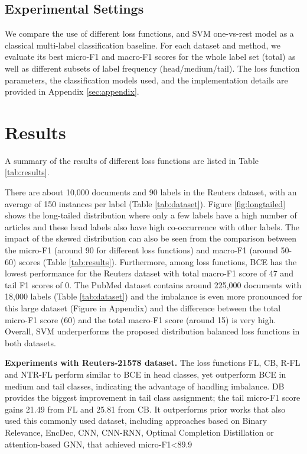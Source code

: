 \documentclass[11pt]{article}
\begin{document}
\subsection{Experimental Settings}
We compare the use of 
different loss functions, and SVM one-vs-rest model as a classical multi-label classification baseline. 
For each dataset and method, we evaluate its best micro-F1 and macro-F1 scores   \citep{wu-etal-2019-learning-learn, Lipton-F1} for the whole label set (total) as well as different 
subsets of label frequency (head/medium/tail). The loss function parameters, the classification models used, and the implementation details are provided in Appendix \ref{sec:appendix}. 





\section{Results}
A summary of the results of different loss functions are listed in Table \ref{tab:results}.

There are about 10,000 documents and 90 labels in the Reuters dataset, with an average of 150 instances per label (Table \ref{tab:dataset}). Figure \ref{fig:longtailed} shows the long-tailed distribution where only a few labels have a high number of articles and these head labels also have high co-occurrence with other labels.  The impact of the skewed distribution can also be seen from the comparison between the micro-F1 (around 90 for different loss functions) and macro-F1 (around 50-60) scores (Table \ref{tab:results}). Furthermore, 
among loss functions, BCE
has the lowest performance for the Reuters dataset with total macro-F1 score of 47 and tail F1 scores of 0. The PubMed dataset contains around 225,000 documents with 18,000 labels (Table \ref{tab:dataset}) and the imbalance is even more pronounced for this large dataset (Figure in Appendix) and the difference between the total micro-F1 score (60) and the total macro-F1 score (around 15) is very high. 
Overall, SVM underperforms the proposed distribution balanced loss functions in both datasets.

\textbf{Experiments with Reuters-21578 dataset.} 
The loss functions FL, CB, R-FL and NTR-FL perform similar to BCE in head classes, yet outperform BCE in medium and tail classes, indicating the advantage of handling imbalance. DB provides the biggest improvement in tail class assignment; the tail micro-F1 score gains 21.49 from FL and 25.81 from CB.
It outperforms prior works that also used this commonly used dataset, including approaches based on Binary Relevance, EncDec, CNN, CNN-RNN, Optimal Completion Distillation or attention-based GNN, that achieved micro-F1<89.9 \citep{nam_neurips, pal2020magnet, tsai2020order}
 
\end{document}

